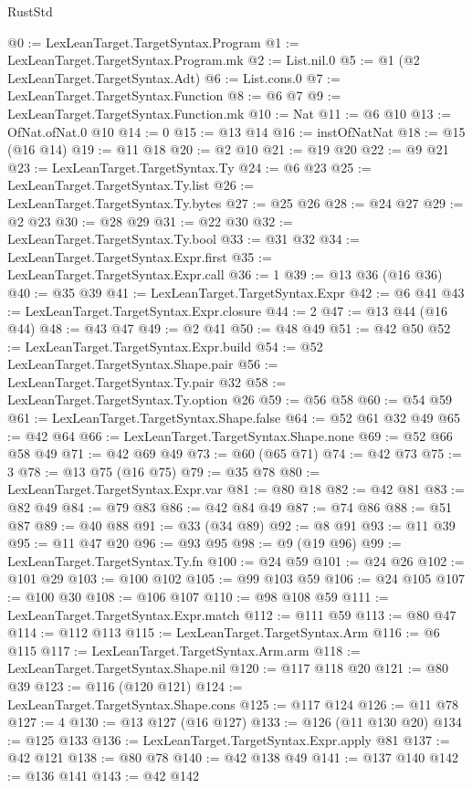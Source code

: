 \begin{lexlean}{RustStd}
\begin{coremodule}
@0 := LexLeanTarget.TargetSyntax.Program
@1 := LexLeanTarget.TargetSyntax.Program.mk
@2 := List.nil.{0}
@5 := @1 (@2 LexLeanTarget.TargetSyntax.Adt)
@6 := List.cons.{0}
@7 := LexLeanTarget.TargetSyntax.Function
@8 := @6 @7
@9 := LexLeanTarget.TargetSyntax.Function.mk
@10 := Nat
@11 := @6 @10
@13 := OfNat.ofNat.{0} @10
@14 := 0
@15 := @13 @14
@16 := instOfNatNat
@18 := @15 (@16 @14)
@19 := @11 @18
@20 := @2 @10
@21 := @19 @20
@22 := @9 @21
@23 := LexLeanTarget.TargetSyntax.Ty
@24 := @6 @23
@25 := LexLeanTarget.TargetSyntax.Ty.list
@26 := LexLeanTarget.TargetSyntax.Ty.bytes
@27 := @25 @26
@28 := @24 @27
@29 := @2 @23
@30 := @28 @29
@31 := @22 @30
@32 := LexLeanTarget.TargetSyntax.Ty.bool
@33 := @31 @32
@34 := LexLeanTarget.TargetSyntax.Expr.first
@35 := LexLeanTarget.TargetSyntax.Expr.call
@36 := 1
@39 := @13 @36 (@16 @36)
@40 := @35 @39
@41 := LexLeanTarget.TargetSyntax.Expr
@42 := @6 @41
@43 := LexLeanTarget.TargetSyntax.Expr.closure
@44 := 2
@47 := @13 @44 (@16 @44)
@48 := @43 @47
@49 := @2 @41
@50 := @48 @49
@51 := @42 @50
@52 := LexLeanTarget.TargetSyntax.Expr.build
@54 := @52 LexLeanTarget.TargetSyntax.Shape.pair
@56 := LexLeanTarget.TargetSyntax.Ty.pair @32
@58 := LexLeanTarget.TargetSyntax.Ty.option @26
@59 := @56 @58
@60 := @54 @59
@61 := LexLeanTarget.TargetSyntax.Shape.false
@64 := @52 @61 @32 @49
@65 := @42 @64
@66 := LexLeanTarget.TargetSyntax.Shape.none
@69 := @52 @66 @58 @49
@71 := @42 @69 @49
@73 := @60 (@65 @71)
@74 := @42 @73
@75 := 3
@78 := @13 @75 (@16 @75)
@79 := @35 @78
@80 := LexLeanTarget.TargetSyntax.Expr.var
@81 := @80 @18
@82 := @42 @81
@83 := @82 @49
@84 := @79 @83
@86 := @42 @84 @49
@87 := @74 @86
@88 := @51 @87
@89 := @40 @88
@91 := @33 (@34 @89)
@92 := @8 @91
@93 := @11 @39
@95 := @11 @47 @20
@96 := @93 @95
@98 := @9 (@19 @96)
@99 := LexLeanTarget.TargetSyntax.Ty.fn
@100 := @24 @59
@101 := @24 @26
@102 := @101 @29
@103 := @100 @102
@105 := @99 @103 @59
@106 := @24 @105
@107 := @100 @30
@108 := @106 @107
@110 := @98 @108 @59
@111 := LexLeanTarget.TargetSyntax.Expr.match
@112 := @111 @59
@113 := @80 @47
@114 := @112 @113
@115 := LexLeanTarget.TargetSyntax.Arm
@116 := @6 @115
@117 := LexLeanTarget.TargetSyntax.Arm.arm
@118 := LexLeanTarget.TargetSyntax.Shape.nil
@120 := @117 @118 @20
@121 := @80 @39
@123 := @116 (@120 @121)
@124 := LexLeanTarget.TargetSyntax.Shape.cons
@125 := @117 @124
@126 := @11 @78
@127 := 4
@130 := @13 @127 (@16 @127)
@133 := @126 (@11 @130 @20)
@134 := @125 @133
@136 := LexLeanTarget.TargetSyntax.Expr.apply @81
@137 := @42 @121
@138 := @80 @78
@140 := @42 @138 @49
@141 := @137 @140
@142 := @136 @141
@143 := @42 @142

\end{coremodule}
\end{lexlean}
